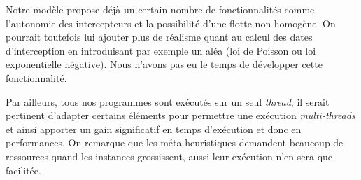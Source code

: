         Notre modèle propose déjà un certain nombre de fonctionnalités comme l'autonomie des intercepteurs et la possibilité d'une flotte non-homogène. On pourrait toutefois lui ajouter plus de réalisme quant au calcul des dates d'interception en introduisant par exemple un aléa (loi de Poisson ou loi exponentielle négative). Nous n'avons pas eu le temps de développer cette fonctionnalité.

        Par ailleurs, tous nos programmes sont exécutés sur un seul \emph{thread}, il serait pertinent d'adapter certains éléments pour permettre une exécution \emph{multi-threads} et ainsi apporter un gain significatif en temps d'exécution et donc en performances. On remarque que les méta-heuristiques demandent beaucoup de ressources quand les instances grossissent, aussi leur exécution n'en sera que facilitée.
